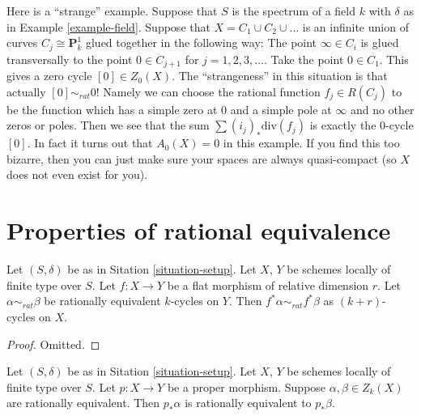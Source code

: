 \begin{example}
\label{example-weird}
Here is a ``strange'' example.
Suppose that $S$ is the spectrum of a field $k$
with $\delta$ as in Example \ref{example-field}.
Suppose that $X = C_1 \cup C_2 \cup \ldots$ is an infinite
union of curves $C_j \cong \mathbf{P}^1_k$ glued together
in the following way: The point $\infty \in C_i$ is glued
transversally to the point $0 \in C_{j + 1}$ for $j = 1, 2, 3, \ldots$.
Take the point $0 \in C_1$. This gives a zero cycle
$[0] \in Z_0(X)$. The ``strangeness'' in this situation is
that actually $[0] \sim_{rat} 0$! Namely we can choose
the rational function $f_j \in R(C_j)$ to be the function
which has a simple zero at $0$ and a simple pole at $\infty$
and no other zeros or poles. Then we see that the sum
$\sum (i_j)_*\text{div}(f_j)$ is exactly the $0$-cycle
$[0]$. In fact it turns out that $A_0(X) = 0$ in this example.
If you find this too bizarre, then you can just
make sure your spaces are always quasi-compact
(so $X$ does not even exist for you).
\end{example}









\section{Properties of rational equivalence}
\label{section-properties-rational-equivalence}

\begin{lemma}
\label{lemma-flat-pullback-rational-equivalence}
Let $(S, \delta)$ be as in Sitation \ref{situation-setup}.
Let $X$, $Y$ be schemes locally of finite type over $S$.
Let $f : X \to Y$ be a flat morphism of relative dimension $r$.
Let $\alpha \sim_{rat} \beta$ be rationally equivalent $k$-cycles on $Y$.
Then $f^*\alpha \sim_{rat} f^*\beta$ as $(k + r)$-cycles on $X$.
\end{lemma}

\begin{proof}
Omitted.
\end{proof}

\begin{lemma}
\label{lemma-proper-pushforward-rational-equivalence}
Let $(S, \delta)$ be as in Sitation \ref{situation-setup}.
Let $X$, $Y$ be schemes locally of finite type over $S$.
Let $p : X \to Y$ be a proper morphism.
Suppose $\alpha, \beta \in Z_k(X)$ are rationally equivalent.
Then $p_*\alpha$ is rationally equivalent to $p_*\beta$.
\end{lemma}

